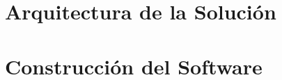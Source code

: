 


% 





\tableofcontents
\listoffigures
\listoftables
\clearpage





\part{Arquitectura de la Solución}



\part{Construcción del Software}



















